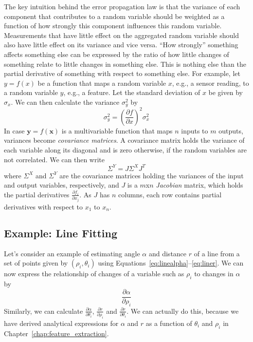 The key intuition behind the error propagation law is that the variance of each component that contributes to a random variable should be weighted as a function of how strongly this component influences this random variable. Measurements that have little effect on the aggregated random variable should also have little effect on its variance and vice versa. ``How strongly'' something affects something else can be expressed by the ratio of how little changes of something relate to little changes in something else. This is nothing else than the partial derivative of something with respect to something else. For example, let $y=f(x)$ be a function that maps a random variable $x$, e.g., a sensor reading, to a random variable $y$, e.g., a feature. Let the standard deviation of $x$ be given by $\sigma_x$. We can then calculate the variance $\sigma_y^2$ by
\begin{equation}
\sigma_y^2=\left(\frac{\partial f}{\partial x}\right)^2 \sigma_x^2
\end{equation}
In case $\mathbf{y}=f(\mathbf{x})$ is a multivariable function that maps $n$ inputs to $m$ outputs, variances become \emph{covariance matrices}. A covariance matrix holds the variance of each variable along its diagonal and is zero otherwise, if the random variables are not correlated. We can then write
\begin{equation}
\Sigma^Y= J \Sigma^X J^T
\end{equation}
where $\Sigma^X$ and $\Sigma^Y$ are the covariance matrices holding the variances of the input and output variables, respectively, and $J$ is a $m$x$n$ \emph{Jacobian} matrix, which holds the partial derivatives $\frac{\partial f_i}{\partial x_j}$. As $J$ has $n$ columns, each row contains partial derivatives with respect to $x_1$ to $x_n$.

\subsection{Example: Line Fitting}\label{sec:linefitting}
Let's consider an example of estimating angle $ \alpha$ and distance $ r$ of a line from a set of points given by $ (\rho_i,\theta_i)$ using Equations~\ref{eq:linealpha}--\ref{eq:liner}. We can now express the relationship of changes of a variable such as $ \rho_i$ to changes in $ \alpha$ by
\begin{equation}
\frac{\partial \alpha}{\partial \rho_i}
\end{equation}
Similarly, we can calculate $ \frac{\partial \alpha}{\partial \theta_i}$, $ \frac{\partial r}{\partial \rho_i}$ and $ \frac{\partial r}{\partial \theta_i}$. We can actually do this, because we have derived analytical expressions for $ \alpha$ and $ r$ as a function of $ \theta_i$ and $ \rho_i$ in Chapter~\ref{chap:feature_extraction}.

